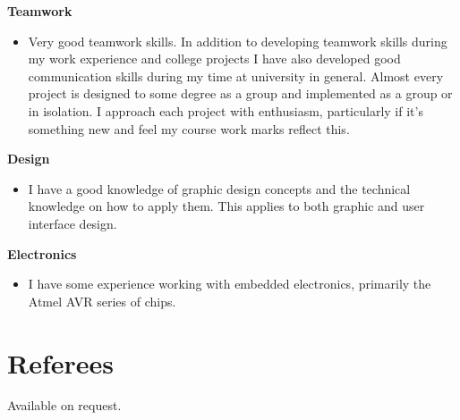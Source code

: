 \documentclass{res}
\begin{document}
\begin{resume}
    {\bf  Teamwork} 
        \begin{itemize}
        \item[]  Very good teamwork skills. In addition to developing teamwork skills during my work experience and college projects I have also developed good communication skills during my time at university in general. Almost every project is designed to some degree as a group and implemented as a group or in isolation. I approach each project with enthusiasm, particularly if it's something new and feel my course work marks reflect this.
       \end{itemize} 

  {\bf Design} 
        \begin{itemize}
        \item[] I have a good knowledge of graphic design concepts and the technical knowledge on how to apply them. This applies to both graphic and user interface design.
       \end{itemize}

   {\bf  Electronics} 
        \begin{itemize}
        \item[]  I have some experience working with embedded electronics, primarily the Atmel AVR series of chips.
       \end{itemize} 

 
\section{Referees}
\vspace{0.1in} 
 
   Available on request.
    
 

\end{resume}
\end{document}
